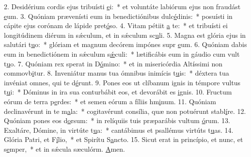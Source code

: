 2. Desidérium cordis ejus tribuísti \uline{e}i:~* et voluntáte labiórum ejus non fraudást \uline{e}um.
3. Quóniam prævenísti eum in benedictiónibus dulc\uline{é}dinis:~* posuísti in cápite ejus corónam de lápide pret\uline{ó}so.
4. Vitam pétiit \uline{a} te:~* et tribuísti ei longitúdinem diérum in sǽculum, et in sǽculum sc\uline{u}li.
5. Magna est glória ejus in salutári t\uline{u}o:~* glóriam et magnum decórem impónes supr \uline{e}um.
6. Quóniam dabis eum in benedictiónem in sǽculum s\uline{ǽ}culi:~* lætificábis eum in gáudio cum vult t\uline{u}o.
7. Quóniam rex sperat in D\uline{ó}mino:~* et in misericórdia Altíssimi non commovb\uline{i}tur.
8. Inveniátur manus tua ómnibus inimícis t\uline{u}is:~* déxtera tua invéniat omnes, qui te d\uline{é}runt.
9. Pones eos ut clíbanum ignis in témpore vultus t\uline{u}i:~* Dóminus in ira sua conturbábit eos, et devorábit es \uline{i}gnis.
10. Fructum eórum de terra p\uline{e}rdes:~* et semen eórum a fíliis hm\uline{i}num.
11. Quóniam declinavérunt in te m\uline{a}la:~* cogitavérunt consília, quæ non potuérunt stabl\uline{í}re.
12. Quóniam pones eos d\uline{o}rsum:~* in relíquiis tuis præparábis vultum \uline{ó}rum.
13. Exaltáre, Dómine, in virtúte t\uline{u}a:~* cantábimus et psallémus virtúts t\uline{u}as.
14. Glória Patri, et F\uline{í}lio,~* et Spirítu S\uline{a}ncto.
15. Sicut erat in princípio, et nunc, et s\uline{e}mper,~* et in sǽcula sæculórm. \uline{A}men.
